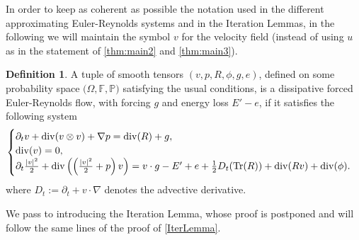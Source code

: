 \documentclass[10pt,a4paper]{amsart}
\numberwithin{equation}{section}
\numberwithin{corollario}{section}
\numberwithin{lemma}{section}
\numberwithin{prop}{section}
\theoremstyle{definition}
\newtheorem{defn}[thm]{Definition}
\theoremstyle{remark}
\newcommand{\dvg}{\mathord{{\rm div}}}
\DeclareMathOperator{\Tr}{Tr}
\begin{document}
In order to keep as coherent as possible the notation used in the different approximating Euler-Reynolds systems and in the Iteration Lemmas, in the following we will maintain the symbol $v$ for the velocity field (instead of using $u$ as in the statement of \autoref{thm:main2} and \autoref{thm:main3}). 
    \begin{defn}\label{defn:forced-Euler-Reynolds}
    A tuple of smooth tensors $(v,p,R,\phi,g,e)$, defined on some probability space $(\Omega,\mathbb{F},\mathbb{P)}$ satisfying the usual conditions, is a dissipative forced Euler-Reynolds flow, with forcing $g$ and energy loss $E' -e$, if it satisfies the following system
    \begin{align} \label{eq:ApproxEuler.forced}
    \begin{cases}
    \partial_tv+\dvg(v\otimes v)+\nabla p=\dvg(R) + g,
    \\
    \dvg(v) = 0,
    \\
     \partial_t\frac{|v|^2}{2}+\dvg\left(\left(\frac{|v|^2}{2}+p\right)v\right)=v \cdot g-E'+e
     +\frac{1}{2}D_t(\Tr(R))+\dvg(Rv)+\dvg (\phi).
    \end{cases}
    \end{align}
     where $D_t:=\partial_t+v\cdot \nabla$ denotes the advective derivative.
\end{defn}
We pass to introducing the Iteration Lemma, whose proof is postponed and will follow the same lines of the proof of \autoref{IterLemma}. 
\end{document}
